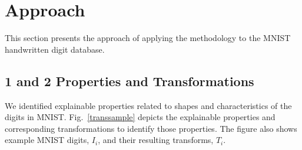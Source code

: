 \documentclass[conference]{IEEEtran}
\begin{document}
\section{Approach}

This section presents the approach of applying the methodology to the MNIST handwritten digit database. 

\subsection{1 and 2 Properties and Transformations}

We identified explainable properties related to shapes and characteristics of the digits in MNIST.  Fig.~\ref{transsample} depicts the explainable properties and corresponding transformations to identify those properties.  The figure also shows example MNIST digits, $I_i$, and their resulting transforms, $T_i$.
\end{document}
